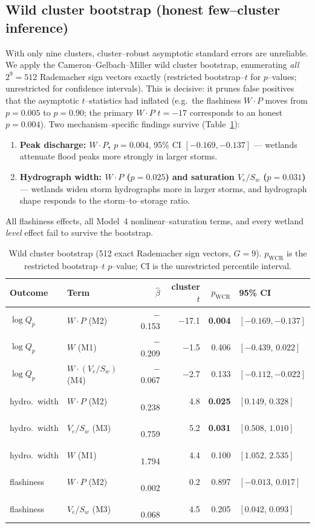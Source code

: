 \documentclass[11pt]{article}
\begin{document}
\subsection{Wild cluster bootstrap (honest few--cluster inference)}
With only nine clusters, cluster--robust asymptotic standard errors are unreliable. We apply
the Cameron--Gelbach--Miller wild cluster bootstrap, enumerating \emph{all} $2^9=512$
Rademacher sign vectors exactly (restricted bootstrap--$t$ for $p$--values; unrestricted for
confidence intervals). This is decisive: it prunes false positives that the asymptotic
$t$--statistics had inflated (e.g.\ the flashiness $W\!\cdot\!P$ moves from $p=0.005$ to
$p=0.90$; the primary $W\!\cdot\!P$ $t=-17$ corresponds to an honest $p=0.004$). Two
mechanism--specific findings survive (Table~\ref{tab:wcb}):
\begin{enumerate}\itemsep2pt
\item \textbf{Peak discharge: $W\!\cdot\!P$, $p=0.004$}, 95\% CI $[-0.169,-0.137]$ ---
wetlands attenuate flood peaks more strongly in larger storms.
\item \textbf{Hydrograph width: $W\!\cdot\!P$ ($p=0.025$) and saturation $V_e/S_w$ ($p=0.031$)}
--- wetlands widen storm hydrographs more in larger storms, and hydrograph shape responds to
the storm--to--storage ratio.
\end{enumerate}
All flashiness effects, all Model~4 nonlinear--saturation terms, and every wetland \emph{level}
effect fail to survive the bootstrap.

\begin{table}[htbp]\centering
\caption{Wild cluster bootstrap (512 exact Rademacher sign vectors, $G=9$). $p_{\text{WCR}}$
is the restricted bootstrap--$t$ $p$--value; CI is the unrestricted percentile interval.}
\label{tab:wcb}
\small
\begin{tabular}{llrrrl}
\toprule
Outcome & Term & $\hat\beta$ & cluster $t$ & $p_{\text{WCR}}$ & 95\% CI \\
\midrule
$\log Q_p$      & $W\!\cdot\!P$ (M2)          & $-$0.153 & $-$17.1 & \textbf{0.004} & $[-0.169,-0.137]$ \\
$\log Q_p$      & $W$ (M1)                    & $-$0.209 & $-$1.5  & 0.406 & $[-0.439,\,0.022]$ \\
$\log Q_p$      & $W\!\cdot\!(V_e/S_w)$ (M4)  & $-$0.067 & $-$2.7  & 0.133 & $[-0.112,-0.022]$ \\
hydro.\ width   & $W\!\cdot\!P$ (M2)          & $\phantom{-}$0.238 & 4.8 & \textbf{0.025} & $[0.149,\,0.328]$ \\
hydro.\ width   & $V_e/S_w$ (M3)              & $\phantom{-}$0.759 & 5.2 & \textbf{0.031} & $[0.508,\,1.010]$ \\
hydro.\ width   & $W$ (M1)                    & $\phantom{-}$1.794 & 4.4 & 0.100 & $[1.052,\,2.535]$ \\
flashiness      & $W\!\cdot\!P$ (M2)          & $\phantom{-}$0.002 & 0.2 & 0.897 & $[-0.013,\,0.017]$ \\
flashiness      & $V_e/S_w$ (M3)              & $\phantom{-}$0.068 & 4.5 & 0.205 & $[0.042,\,0.093]$ \\
\bottomrule
\end{tabular}
\end{table}
\end{document}
